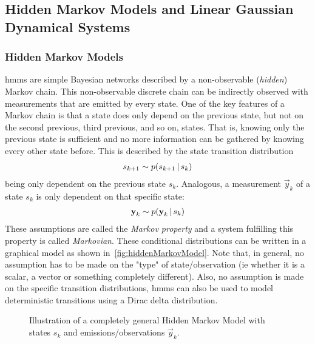 \subsection{Hidden Markov Models and Linear Gaussian Dynamical Systems}
	\subsubsection{Hidden Markov Models}
		\label{subsec:hiddenMarkovModel}

		\acp{hmm} are simple Bayesian networks described by a non-observable (\emph{hidden}) Markov chain. This non-observable discrete chain can be indirectly observed with measurements that are emitted by every state. One of the key features of a Markov chain is that a state does only depend on the previous state, but not on the second previous, third previous, and so on, states. That is, knowing only the previous state is sufficient and no more information can be gathered by knowing every other state before. This is described by the state transition distribution
		\begin{align*}
			s_{k + 1} \sim p(s_{k + 1} \,\vert\, s_k)
		\end{align*}
		being only dependent on the previous state \(s_k\). Analogous, a measurement \(\vec{y}_k\) of a state \(s_k\) is only dependent on that specific state:
		\begin{align*}
			\boldsymbol{\mathrm{y}}_k \sim p(\boldsymbol{\mathrm{y}}_k \,\vert\, s_k)
		\end{align*}
		These assumptions are called the \emph{Markov property} and a system fulfilling this property is called \emph{Markovian}. These conditional distributions can be written in a graphical model as shown in~\autoref{fig:hiddenMarkovModel}. Note that, in general, no assumption has to be made on the "type" of state/observation (\ac{ie} whether it is a scalar, a vector or something completely different). Also, no assumption is made on the specific transition distributions, \acp{hmm} can also be used to model deterministic transitions using a Dirac delta distribution.

		\begin{figure}
			\centering
			\tikzHiddenMarkovModel
			\caption{Illustration of a completely general Hidden Markov Model with states \(s_k\) and emissions/observations \(\vec{y}_k\).}
			\label{fig:hiddenMarkovModel}
		\end{figure}

